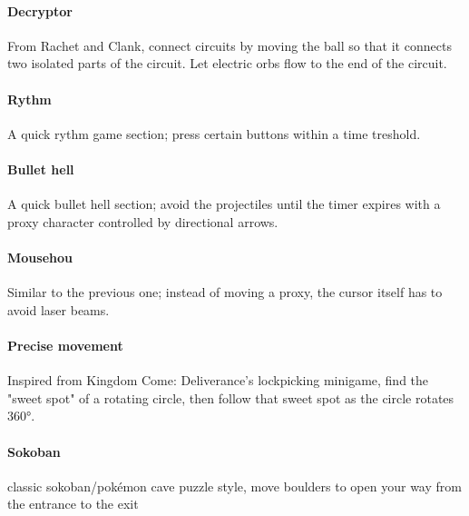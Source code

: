 
\pagebreak

\paragraph{Decryptor} From Rachet and Clank, connect circuits by moving the ball so that it connects two isolated parts of the circuit. Let electric orbs flow to the end of the circuit.


\paragraph{Rythm} A quick rythm game section; press certain buttons within a time treshold.

\paragraph{Bullet hell} A quick bullet hell section; avoid the projectiles until the timer expires with a proxy character controlled by directional arrows. 

\paragraph{Mousehou} Similar to the previous one; instead of moving a proxy, the cursor itself has to avoid laser beams.

\paragraph{Precise movement} Inspired from Kingdom Come: Deliverance's lockpicking minigame, find the "sweet spot" of a rotating circle, then follow that sweet spot as the circle rotates 360°.


\paragraph{Sokoban} classic sokoban/pokémon cave puzzle style, move boulders to open your way from the entrance to the exit


